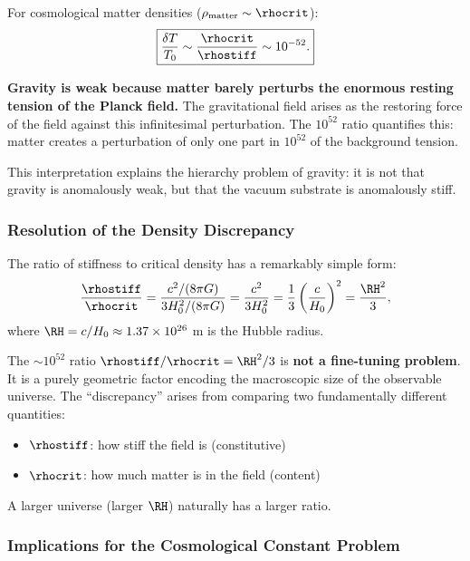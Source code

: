 For cosmological matter densities ($\rho_{\mathrm{matter}} \sim \rhocrit$):
\begin{equation}
\label{eq:weak_gravity_ratio}
\boxed{\frac{\delta T}{T_0} \sim \frac{\rhocrit}{\rhostiff} \sim 10^{-52}.}
\end{equation}

\textbf{Gravity is weak because matter barely perturbs the enormous resting tension of the Planck field.} The gravitational field arises as the restoring force of the field against this infinitesimal perturbation. The $10^{52}$ ratio quantifies this: matter creates a perturbation of only one part in $10^{52}$ of the background tension.

This interpretation explains the hierarchy problem of gravity: it is not that gravity is anomalously weak, but that the vacuum substrate is anomalously stiff.

\subsubsection{Resolution of the Density Discrepancy}
\label{sec:discrepancy_resolution}

The ratio of stiffness to critical density has a remarkably simple form:
\begin{equation}
\label{eq:density_ratio_main}
\frac{\rhostiff}{\rhocrit} = \frac{c^2/(8\pi G)}{3H_0^2/(8\pi G)} = \frac{c^2}{3H_0^2} = \frac{1}{3}\left(\frac{c}{H_0}\right)^2 = \frac{\RH^2}{3},
\end{equation}
where $\RH = c/H_0 \approx 1.37 \times 10^{26}$ m is the Hubble radius.

\begin{proposition}
The $\sim 10^{52}$ ratio $\rhostiff/\rhocrit = \RH^2/3$ is \textbf{not a fine-tuning problem}. It is a purely geometric factor encoding the macroscopic size of the observable universe. The ``discrepancy'' arises from comparing two fundamentally different quantities:
\begin{itemize}
    \item $\rhostiff$: how stiff the field is (constitutive)
    \item $\rhocrit$: how much matter is in the field (content)
\end{itemize}
A larger universe (larger $\RH$) naturally has a larger ratio.
\end{proposition}

\subsubsection{Implications for the Cosmological Constant Problem}
\label{sec:CC_implications}

